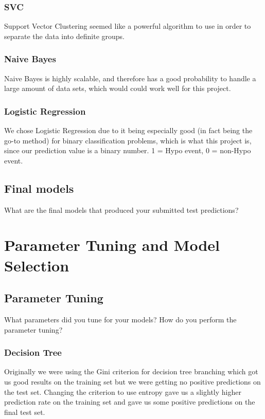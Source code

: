 \documentclass[11pt,a4paper]{article}
\begin{document}
		\subsubsection{SVC}
			Support Vector Clustering seemed like a powerful algorithm to use in order to separate the data into definite groups.

		\subsubsection{Naive Bayes}
			Naive Bayes is highly scalable, and therefore has a good probability to handle a large amount of data sets, which would could work well for this project.

		\subsubsection{Logistic Regression}
			We chose Logistic Regression due to it being especially good (in fact being the go-to method) for binary classification problems, which is what this project is, since our prediction value is a binary number. 1 = Hypo event, 0 = non-Hypo event.

	\subsection{Final models}
		What are the final models that produced your submitted test predictions?

\section{Parameter Tuning and Model Selection }
	\subsection{Parameter Tuning}
		What parameters did you tune for your models?
		How do you perform the parameter tuning?

		\subsubsection{Decision Tree}
			Originally we were using the Gini criterion for decision tree branching which got us good results on the training set but we were getting no positive predictions on the test set.
			Changing the criterion to use entropy gave us a slightly higher prediction rate on the training set and gave us some positive predictions on the final test set.
\end{document}
